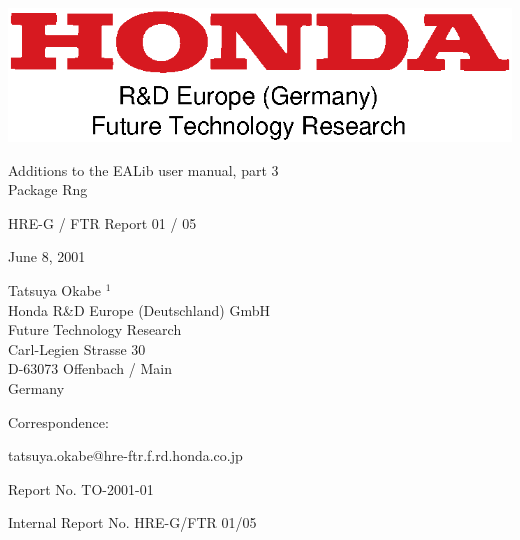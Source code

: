 \begin{center}
\includegraphics{honda-ftr.eps}

\vspace*{70pt}
{\LARGE
Additions to the EALib user manual, part 3}\\
{\LARGE
Package Rng}\\

\vspace*{10mm}

HRE-G / FTR Report 01 / 05\\

\vspace*{30mm}

June 8, 2001\\

\vspace*{30mm}

Tatsuya Okabe $^1$\\

Honda R\&D Europe (Deutschland) GmbH\\
Future Technology Research\\
Carl-Legien Strasse 30\\
D-63073 Offenbach / Main\\
Germany\\

\vspace*{30mm}

\end{center}

\noindent
Correspondence:

\noindent
tatsuya.okabe@hre-ftr.f.rd.honda.co.jp

\clearpage

\noindent
Report No. TO-2001-01

\noindent
Internal Report No. HRE-G/FTR 01/05
